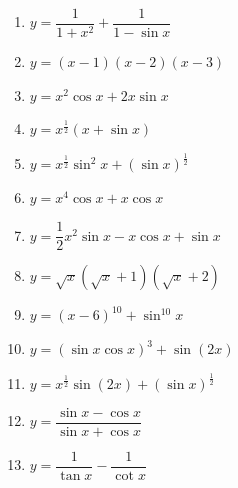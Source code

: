 \documentclass[12pt,fleqn]{book} %
\begin{document}
\begin{enumerate}
\begin{multicols}{2}
\begin{enumerate}
\item $y=\dfrac{1}{1+x^2}+\dfrac{1}{1-\sin x}$
\item $y=(x-1)(x-2)(x-3)$
\item $y=x^2\cos x+2x\sin x$
\item $y=x^{\frac{1}{2}}(x+\sin x)$
\item $y=x^{\frac{1}{2}}\sin^2 x+(\sin x)^{\frac{1}{2}}$
\item $y=x^4 \cos x+x\cos x$
\item $y=\dfrac{1}{2}x^2\sin x-x\cos x+\sin x$
\item $y=\sqrt{x}(\sqrt{x}+1)(\sqrt{x}+2)$
\item $y=(x-6)^{10}+\sin^{10} x$
\item $y=(\sin x\cos x)^3+\sin (2x)$
\item $y=x^{\frac{1}{2}} \sin (2x) +(\sin x)^{\frac{1}{2}}$
\item $y=\dfrac{\sin x-\cos x}{\sin x+\cos x}$
\item $y=\dfrac{1}{\tan x}-\dfrac{1}{\cot x}$
\end{enumerate}
\end{multicols}
\end{enumerate}
\end{document}
